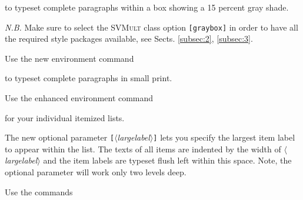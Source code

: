 \documentclass[graybox]{svmult}
\begin{document}
\begin{refguide}
\begin{sloppy}
to typeset complete paragraphs within a box showing a 15 percent gray shade.

\textit{N.B.} Make sure to select the \textsc{SVMult} class option \verb|[graybox]| in order to have
all the required style packages available, see Sects. \ref{subsec:2}, \ref{subsec:3}. 

\clearpage

Use the new environment command

\cprotect{}

to typeset complete paragraphs in small print.

Use the enhanced environment command

\cprotect{}

for your individual itemized lists.

The new optional parameter \verb|[|$\langle$\textit{largelabel}$\rangle$\verb|]| lets you specify the largest item label
to appear within the list. The texts of all items are indented by the width of
\verb||$\langle$\textit{largelabel}$\rangle$\verb|| and the item labels are typeset flush left within this space. Note,
the optional parameter will work only two levels deep.

Use the commands

\cprotect{}


\end{sloppy}
\end{refguide}
\end{document}

